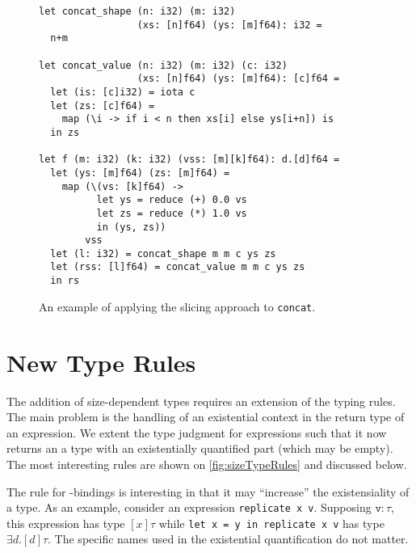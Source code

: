 \begin{figure}

\begin{lstlisting}
let concat_shape (n: i32) (m: i32)
                 (xs: [n]f64) (ys: [m]f64): i32 =
  n+m

let concat_value (n: i32) (m: i32) (c: i32)
                 (xs: [n]f64) (ys: [m]f64): [c]f64 =
  let (is: [c]i32) = iota c
  let (zs: [c]f64) =
    map (\i -> if i < n then xs[i] else ys[i+n]) is
  in zs

let f (m: i32) (k: i32) (vss: [m][k]f64): d.[d]f64 =
  let (ys: [m]f64) (zs: [m]f64) =
    map (\(vs: [k]f64) ->
          let ys = reduce (+) 0.0 vs
          let zs = reduce (*) 1.0 vs
          in (ys, zs))
        vss
  let (l: i32) = concat_shape m m c ys zs
  let (rss: [l]f64) = concat_value m m c ys zs
  in rs
\end{lstlisting}

  \caption{An example of applying the slicing approach to \lstinline{concat}.}
  \label{fig:FShapeSlice}
\end{figure}

\section{New Type Rules}
\label{sec:size-type-rules}

The addition of size-dependent types requires an extension of the
typing rules.  The main problem is the handling of an existential
context in the return type of an expression.  We extent the type
judgment for expressions such that it now returns an a type with an
existentially quantified part (which may be empty).  The most
interesting rules are shown on \cref{fig:sizeTypeRules} and discussed
below.

The rule for -bindings is interesting in that it may
``increase'' the existensiality of a type.  As an example, consider an
expression \lstinline{replicate x v}.  Supposing $\texttt{v}: \tau$,
this expression has type $[x]\tau$ %
while \mbox{\lstinline{let x = y in replicate x v}} has type
$\exists d.[d]\tau$.  The specific names used in the existential
quantification do not matter.

